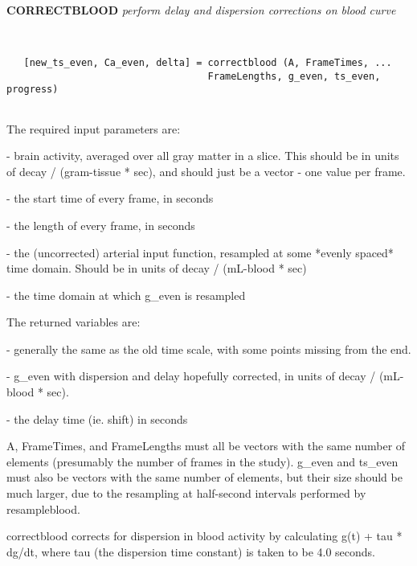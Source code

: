 
{\large\bf CORRECTBLOOD} {\em  perform delay and dispersion corrections on blood curve}
\begin{verbatim}


   [new_ts_even, Ca_even, delta] = correctblood (A, FrameTimes, ...
                                   FrameLengths, g_even, ts_even, progress)


\end{verbatim}

   The required input parameters are: 
\begin{description}
\item {} - brain activity, averaged over all gray matter in a slice.  This
           should be in units of decay / (gram-tissue * sec), and should
           just be a vector - one value per frame.
\item {} - the start time of every frame, in seconds
\item {} - the length of every frame, in seconds
\item {} - the (uncorrected) arterial input function, resampled at
                some *evenly spaced* time domain.  Should be in units
                of decay / (mL-blood * sec)
\item {} - the time domain at which g\_even is resampled
\end{description}
 
   The returned variables are:
\begin{description}
\item {} - generally the same as the old time scale,
                     with some points missing from the end.
\item {} - g\_even with dispersion and delay hopefully corrected,
                 in units of decay / (mL-blood * sec).  
\item {} - the delay time (ie. shift) in seconds
\end{description}
 
   A, FrameTimes, and FrameLengths must all be vectors with the same
   number of elements (presumably the number of frames in the study).
   g\_even and ts\_even must also be vectors with the same number of
   elements, but their size should be much larger, due to the
   resampling at half-second intervals performed by resampleblood.
   
   correctblood corrects for dispersion in blood activity by
   calculating g(t) + tau * dg/dt, where tau (the dispersion time
   constant) is taken to be 4.0 seconds.
 
